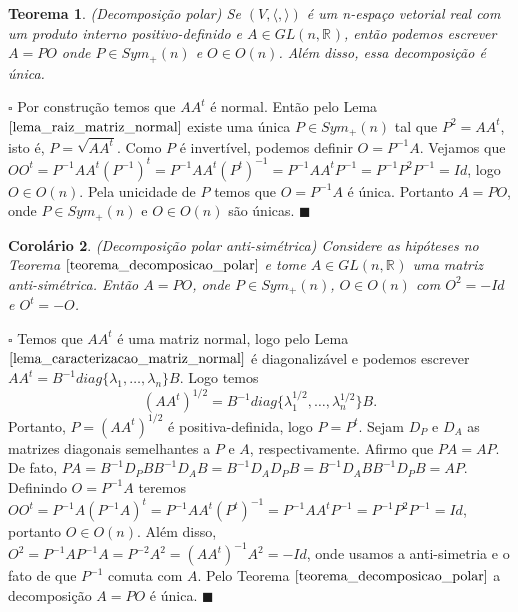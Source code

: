 \documentclass[12pt]{book}
\newtheorem{teorema}{Teorema}[section]
\newtheorem{corolario}[teorema]{Corolário}
\newenvironment{prova}[1]{$\square$ #1}{\hfill$\blacksquare$}
\newcommand{\generalgroup}[2]{GL(#1, #2)}
\newcommand{\generalgroupreal}[1]{\generalgroup{#1}{\real{}}}
\newcommand{\matrizortogonal}[1]{O(#1)}
\newcommand{\matrizsimetricapositiva}[1]{Sym_{+}(#1)}
\newcommand{\produtointerno}[2]{\langle #1, #2 \rangle}
\newcommand{\real}[1]{\mathbb{R}^{#1}}
\begin{document}
	\begin{teorema}\label{teorema_decomposicao_polar}
		(Decomposição polar) Se $(V, \produtointerno{}{})$ é um n-espaço vetorial real com um produto interno positivo-definido e $A \in \generalgroupreal{n}$, então podemos escrever $A=PO$ onde $P \in  \matrizsimetricapositiva{n}$ e $O \in \matrizortogonal{n}$. Além disso, essa decomposição é única.
	\end{teorema}
	\begin{prova}
		Por construção temos que $AA^{t}$ é normal. Então pelo Lema $\ref{lema_raiz_matriz_normal}$ existe uma única $P \in \matrizsimetricapositiva{n}$ tal que $P^{2} = AA^{t}$, isto é, $P = \sqrt{AA^{t}}$. Como $P$ é invertível, podemos definir $O = P^{-1}A$. Vejamos que $OO^{t} = P^{-1}AA^{t}(P^{-1})^{t} = P^{-1}AA^{t}(P^{t})^{-1} = P^{-1}AA^{t}P^{-1} = P^{-1}P^{2}P^{-1} = Id$, logo $O \in \matrizortogonal{n}$. Pela unicidade de $P$ temos que $O=P^{-1}A$ é única. Portanto $A=PO$, onde $P \in \matrizsimetricapositiva{n}$ e $O \in \matrizortogonal{n}$ são únicas.
	\end{prova}
	
	\begin{corolario}\label{corolario_decomposicao_matriz_antisimetrica}
		(Decomposição polar anti-simétrica) Considere as hipóteses no Teorema $\ref{teorema_decomposicao_polar}$ e tome $A \in \generalgroupreal{n}$ uma matriz anti-simétrica. Então $A = PO$, onde $P \in \matrizsimetricapositiva{n}$, $O \in \matrizortogonal{n}$ com  $O^{2} = -Id$ e $O^{t} = -O$.
	\end{corolario}
	\begin{prova}
		Temos que $AA^{t}$ é uma matriz normal, logo pelo Lema $\ref{lema_caracterizacao_matriz_normal}$ é diagonalizável e podemos escrever $AA^{t} = B^{-1}diag\{\lambda_{1}, \dots, \lambda_{n}\}B$. Logo temos 
		$$
		(AA^{t})^{1/2} =B^{-1}diag\{\lambda_{1}^{1/2}, \dots, \lambda_{n}^{1/2}\}B.
		$$
		Portanto, $P=(AA^{t})^{1/2}$ é positiva-definida, logo $P=P^{t}$. Sejam $D_{P}$ e $D_{A}$ as matrizes diagonais semelhantes a $P$ e $A$, respectivamente. Afirmo que $PA = AP$. De fato, $PA = B^{-1}D_{P}B B^{-1}D_{A}B = B^{-1}D_{A} D_{P}B = B^{-1}D_{A}B B^{-1}D_{P}B = AP$. Definindo $O = P^{-1}A$ teremos $OO^{t} = P^{-1}A(P^{-1}A)^{t} = P^{-1}AA^{t}(P^{t})^{-1} = P^{-1}AA^{t}P^{-1} = P^{-1}P^{2}P^{-1}  = Id$, portanto $O \in \matrizortogonal{n}$. Além disso, $O^{2} = P^{-1}AP^{-1}A = P^{-2}A^{2} = (AA^{t})^{-1}A^{2} = -Id$, onde usamos a anti-simetria e o fato de que $P^{-1}$ comuta com $A$. Pelo Teorema $\ref{teorema_decomposicao_polar}$ a decomposição $A=PO$ é única.
	\end{prova}
	
\end{document}
